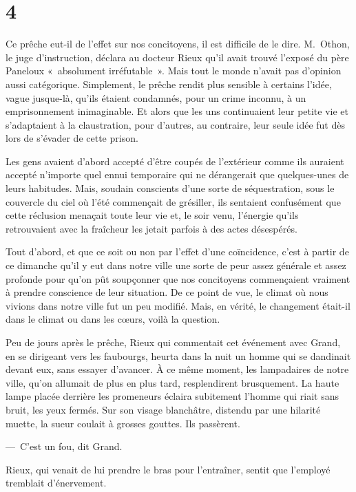 \documentclass[french,twoside]{book} %
\begin{document}
\section[{4}]{4}
\noindent Ce prêche eut-il de l’effet sur nos concitoyens, il est difficile de le dire. M. Othon, le juge d’instruction, déclara au docteur Rieux qu’il avait trouvé l’exposé du père Paneloux « absolument irréfutable ». Mais tout le monde n’avait pas d’opinion aussi catégorique. Simplement, le prêche rendit plus sensible à certains l’idée, vague jusque-là, qu’ils étaient condamnés, pour un crime inconnu, à un emprisonnement inimaginable. Et alors que les uns continuaient leur petite vie et s’adaptaient à la claustration, pour d’autres, au contraire, leur seule idée fut dès lors de s’évader de cette prison.\par
Les gens avaient d’abord accepté d’être coupés de l’extérieur comme ils auraient accepté n’importe quel ennui temporaire qui ne dérangerait que quelques-unes de leurs habitudes. Mais, soudain conscients d’une sorte de séquestration, sous le couvercle du ciel où l’été commençait de grésiller, ils sentaient confusément que cette réclusion menaçait toute leur vie et, le soir venu, l’énergie qu’ils retrouvaient avec la fraîcheur les jetait parfois à des actes désespérés.\par
Tout d’abord, et que ce soit ou non par l’effet d’une coïncidence, c’est à partir de ce dimanche qu’il y eut dans notre ville une sorte de peur assez générale et assez profonde pour qu’on pût soupçonner que nos concitoyens commençaient vraiment à prendre conscience de leur situation. De ce point de vue, le climat où nous vivions dans notre ville fut un peu modifié. Mais, en vérité, le changement était-il dans le climat ou dans les cœurs, voilà la question.\par
Peu de jours après le prêche, Rieux qui commentait cet événement avec Grand, en se dirigeant vers les faubourgs, heurta dans la nuit un homme qui se dandinait devant eux, sans essayer d’avancer. À ce même moment, les lampadaires de notre ville, qu’on allumait de plus en plus tard, resplendirent brusquement. La haute lampe placée derrière les promeneurs éclaira subitement l’homme qui riait sans bruit, les yeux fermés. Sur son visage blanchâtre, distendu par une hilarité muette, la sueur coulait à grosses gouttes. Ils passèrent.\par
— C’est un fou, dit Grand.\par
Rieux, qui venait de lui prendre le bras pour l’entraîner, sentit que l’employé tremblait d’énervement.\par
\end{document}
